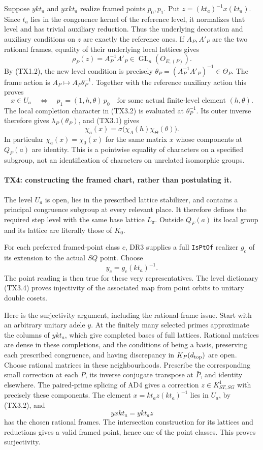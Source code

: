 Suppose \(ykt_a\) and \(yxkt_a\) realize framed points \(p_0,p_1\).
Put \(z=(kt_a)^{-1}x(kt_a)\). Since \(t_a\) lies in the congruence
kernel of the reference level, it normalizes that level and has
trivial auxiliary reduction. Thus the underlying decoration and
auxiliary conditions on \(z\) are exactly the reference ones.
If \(A_P,A'_P\) are the two rational frames, equality of their
underlying local lattices gives
\[
 \rho_P(z)=A_P^{-1}A'_P
       \in\operatorname{GL}_n(O_{E,(P)}).
 \tag{TX3.3}
\]
By (TX1.2), the new level condition is precisely
\(\theta_P=(A_P^{-1}A'_P)^{-1}\in\Theta_P\).
The frame action is \(A_P\mapsto A_P\theta_P^{-1}\).
Together with the reference auxiliary action this proves
\[
 x\in U_a\quad\Longleftrightarrow\quad
 p_1=(1,h,\theta)\,p_0
 \quad\text{for some actual finite-level element }(h,\theta).
 \tag{TX3.4}
\]
The local completion character in (TX3.2) is evaluated at
\(\theta_P^{-1}\). Its outer inverse therefore gives
\(\lambda_P(\theta_P)\), and (TX3.1) gives
\[
 \chi_a(x)=\sigma\bigl(\chi_\Lambda(h)\chi_\Theta(\theta)\bigr).
 \tag{TX3.5}
\]
In particular \(\chi_a(x)=\chi_0(x)\) for the same matrix \(x\)
whose components at \(Q_F(a)\) are identity. This is a pointwise
equality of characters on a specified subgroup, not an identification
of characters on unrelated isomorphic groups.

\paragraph{TX4: constructing the framed chart, rather than postulating it.}
The level \(U_a\) is open, lies in the prescribed lattice stabilizer,
and contains a principal congruence subgroup at every relevant place.
It therefore defines the required step level with the same base
lattice \(L_\pi\). Outside \(Q_F(a)\) its local group and its lattice
are literally those of \(K_0\).

For each preferred framed-point class \(c\), DR3 supplies a full
\texttt{IsPtOf} realizer \(g_c\) of its extension to the actual \(SQ\)
point. Choose
\[
 y_c=g_c(kt_a)^{-1}.
 \tag{TX4.1}
\]
The point reading is then true for these very representatives.
The level dictionary (TX3.4) proves injectivity of the associated
map from point orbits to unitary double cosets.

Here is the surjectivity argument, including the rational-frame issue.
Start with an arbitrary unitary adele \(y\). At the finitely many
selected primes approximate the columns of \(ykt_a\), which give
completed bases of full lattices. Rational
matrices are dense in these completions, and the conditions of being
a basis, preserving each prescribed congruence, and having discrepancy
in \(K_P(d_{\rm top})\) are open. Choose rational matrices in these
neighbourhoods. Prescribe the corresponding small correction at each
\(P\), its inverse conjugate transpose at \(\bar P\), and identity
elsewhere. The paired-prime splicing of AD4 gives a correction
\(z\in K^1_{ST,SG}\) with precisely these components. The element
\(x=kt_a z(kt_a)^{-1}\) lies in \(U_a\), by (TX3.2), and
\[
 yxkt_a=ykt_a z
\]
has the chosen rational frames. The intersection construction for its
lattices and reductions gives a
valid framed point, hence one of the point classes. This proves
surjectivity.

